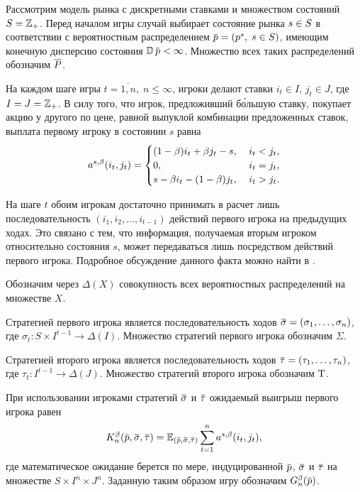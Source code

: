 {Рассмотрим модель рынка с дискретными ставками и множеством состояний $S = \mathbb{Z}_+$.
Перед началом игры случай выбирает состояние рынка $s \in S$ в соответствии с вероятностным распределением $\p = (p^s, \; s \in S)$, имеющим конечную дисперсию состояния $\D \p < \infty$.
Множество всех таких распределений обозначим $\overline{P}$.

На каждом шаге игры $t = \overline{1,n}, \; n \leqslant \infty$, игроки делают ставки $i_t \in I, \, j_t \in J$, где $I = J = \mathbb{Z}_+$.
В силу того, что игрок, предложивший б\'{о}льшую ставку, покупает акцию у другого по цене, равной выпуклой комбинации предложенных ставок, выплата первому игроку в состоянии $s$ равна
\begin{equation*}
  a^{s,\beta}(i_t, j_t) =
  \begin{cases}
    (1-\beta) i_t + \beta j_t - s, &\; i_t < j_t, \\
    0, &\; i_t = j_t, \\
    s - \beta i_t - (1-\beta)j_t, &\; i_t > j_t.
  \end{cases}
\end{equation*}

На шаге $t$ обоим игрокам достаточно принимать в расчет лишь последовательность $(i_1, i_2, \ldots, i_{t-1})$ действий первого игрока на предыдущих ходах.
Это связано с тем, что информация, получаемая вторым игроком относительно состояния $s$, может передаваться лишь посредством действий первого игрока.
Подробное обсуждение данного факта можно найти в \cite{mertens15}.

Обозначим через $\Delta(X)$ совокупность всех вероятностных распределений на множестве $X$.

Стратегией первого игрока является последовательность ходов $\sigmav = (\sigma_1, \ldots, \sigma_n)$, где $\sigma_t: S \times I^{t-1} \rightarrow \Delta(I)$.
Множество стратегий первого игрока обозначим $\Sigma$.

Стратегией второго игрока является последовательность ходов $\tauv = (\tau_1, \ldots, \tau_n)$, где $\tau_t: I^{t-1} \rightarrow \Delta(J)$.
Множество стратегий второго игрока обозначим $\mathrm{T}$.

При использовании игроками стратегий $\sigmav$ и $\tauv$ ожидаемый выигрыш первого игрока равен
\begin{equation*}
  \K(\p, \sigmav, \tauv) =
  \E_{(\p, \sigmav, \tauv)} \sum_{t=1}^n \as(i_t, j_t),
\end{equation*}
где математическое ожидание берется по мере, индуцированной $\p$, $\sigmav$ и $\tauv$ на множестве $S \times I^n \times J^n$.
Заданную таким образом игру обозначим $\theG(\p)$.

}
